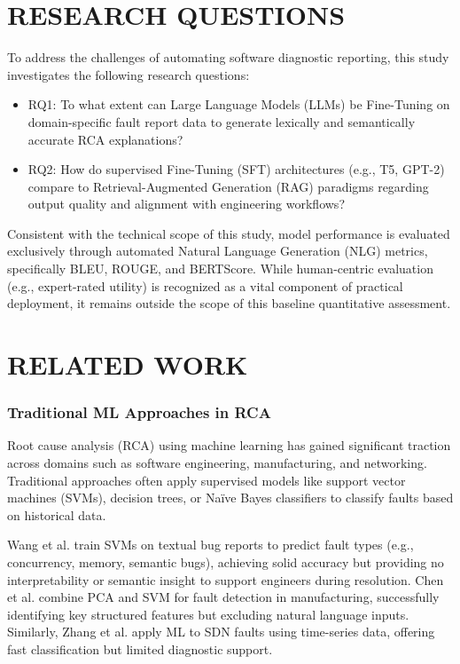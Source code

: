 \documentclass[10pt,twocolumn,journal]{IEEEtran}
\begin{document}
\section{RESEARCH QUESTIONS}
\label{sec:research-questions}

To address the challenges of automating software diagnostic reporting, this study investigates the following research questions:

\begin{itemize}
    \item RQ1: To what extent can Large Language Models (LLMs) be Fine-Tuning on domain-specific fault report data to generate lexically and semantically accurate RCA explanations?
    \item RQ2: How do supervised Fine-Tuning (SFT) architectures (e.g., T5, GPT-2) compare to Retrieval-Augmented Generation (RAG) paradigms regarding output quality and alignment with engineering workflows?
\end{itemize}

Consistent with the technical scope of this study, model performance is evaluated exclusively through automated Natural Language Generation (NLG) metrics, specifically BLEU, ROUGE, and BERTScore. While human-centric evaluation (e.g., expert-rated utility) is recognized as a vital component of practical deployment, it remains outside the scope of this baseline quantitative assessment.

\section{RELATED WORK}
\label{sec:related-work}
\subsubsection{Traditional ML Approaches in RCA}
Root cause analysis (RCA) using machine learning has gained significant traction across domains such as software engineering, manufacturing, and networking. Traditional approaches often apply supervised models like support vector machines (SVMs), decision trees, or Naïve Bayes classifiers to classify faults based on historical data.

Wang et al. \cite{wang2021rootcause} train SVMs on textual bug reports to predict fault types (e.g., concurrency, memory, semantic bugs), achieving solid accuracy but providing no interpretability or semantic insight to support engineers during resolution. Chen et al. \cite{chen2017pca} combine PCA and SVM for fault detection in manufacturing, successfully identifying key structured features but excluding natural language inputs. Similarly, Zhang et al. \cite{zhang2022sdn} apply ML to SDN faults using time-series data, offering fast classification but limited diagnostic support.
\end{document}
